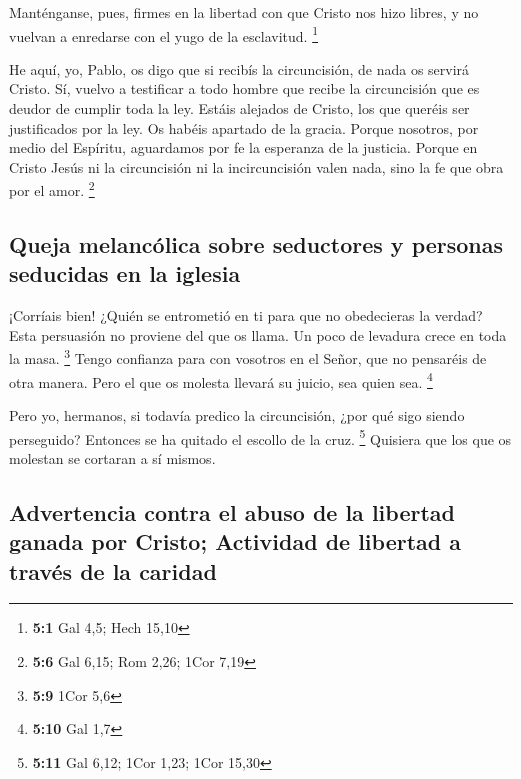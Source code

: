 \begin{paracol}{2}
 Manténganse, pues, firmes en la libertad con que Cristo
nos hizo libres, y no vuelvan a enredarse con el yugo de la esclavitud.
\footnote{\textbf{5:1} Gal 4,5; Hech 15,10}

 He aquí, yo, Pablo, os digo que si recibís la
circuncisión, de nada os servirá Cristo.  Sí, vuelvo a
testificar a todo hombre que recibe la circuncisión que es deudor de
cumplir toda la ley.  Estáis alejados de Cristo, los que
queréis ser justificados por la ley. Os habéis apartado de la gracia.
 Porque nosotros, por medio del Espíritu, aguardamos por
fe la esperanza de la justicia.  Porque en Cristo Jesús ni
la circuncisión ni la incircuncisión valen nada, sino la fe que obra por
el amor. \footnote{\textbf{5:6} Gal 6,15; Rom 2,26; 1Cor 7,19}

\hypertarget{queja-melancuxf3lica-sobre-seductores-y-personas-seducidas-en-la-iglesia}{%
\subsection{Queja melancólica sobre seductores y personas seducidas en
la
iglesia}\label{queja-melancuxf3lica-sobre-seductores-y-personas-seducidas-en-la-iglesia}}

 ¡Corríais bien! ¿Quién se entrometió en ti para que no
obedecieras la verdad?  Esta persuasión no proviene del
que os llama.  Un poco de levadura crece en toda la masa.
\footnote{\textbf{5:9} 1Cor 5,6}  Tengo confianza para
con vosotros en el Señor, que no pensaréis de otra manera. Pero el que
os molesta llevará su juicio, sea quien sea. \footnote{\textbf{5:10} Gal
  1,7}

 Pero yo, hermanos, si todavía predico la circuncisión,
¿por qué sigo siendo perseguido? Entonces se ha quitado el escollo de la
cruz. \footnote{\textbf{5:11} Gal 6,12; 1Cor 1,23; 1Cor 15,30}
 Quisiera que los que os molestan se cortaran a sí
mismos.

\hypertarget{advertencia-contra-el-abuso-de-la-libertad-ganada-por-cristo-actividad-de-libertad-a-travuxe9s-de-la-caridad}{%
\subsection{Advertencia contra el abuso de la libertad ganada por
Cristo; Actividad de libertad a través de la
caridad}\label{advertencia-contra-el-abuso-de-la-libertad-ganada-por-cristo-actividad-de-libertad-a-travuxe9s-de-la-caridad}}


\end{paracol}
